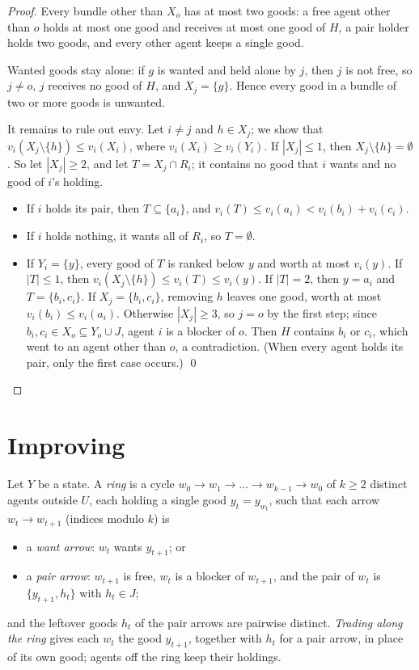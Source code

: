 \documentclass[runningheads,11pt]{llncs}
\begin{document}
\begin{proof}
Every bundle other than $X_o$ has at most two goods: a free agent other than $o$ holds at most one good and receives at most one good of $H$, a pair holder holds two goods, and every other agent keeps a single good.

Wanted goods stay alone: if $g$ is wanted and held alone by $j$, then $j$ is not free, so $j\ne o$, $j$ receives no good of $H$, and $X_j=\{g\}$. Hence every good in a bundle of two or more goods is unwanted.

It remains to rule out envy. Let $i\ne j$ and $h\in X_j$; we show that $v_i(X_j\setminus\{h\})\le v_i(X_i)$, where $v_i(X_i)\ge v_i(Y_i)$. If $|X_j|\le1$, then $X_j\setminus\{h\}=\emptyset$. So let $|X_j|\ge2$, and let $T=X_j\cap R_i$; it contains no good that $i$ wants and no good of $i$'s holding.
\begin{itemize}
\item If $i$ holds its pair, then $T\subseteq\{a_i\}$, and $v_i(T)\le v_i(a_i)<v_i(b_i)+v_i(c_i)$.
\item If $i$ holds nothing, it wants all of $R_i$, so $T=\emptyset$.
\item If $Y_i=\{y\}$, every good of $T$ is ranked below $y$ and worth at most $v_i(y)$. If $|T|\le1$, then $v_i(X_j\setminus\{h\})\le v_i(T)\le v_i(y)$. If $|T|=2$, then $y=a_i$ and $T=\{b_i,c_i\}$. If $X_j=\{b_i,c_i\}$, removing $h$ leaves one good, worth at most $v_i(b_i)\le v_i(a_i)$. Otherwise $|X_j|\ge3$, so $j=o$ by the first step; since $b_i,c_i\in X_o\subseteq Y_o\cup J$, agent $i$ is a blocker of $o$. Then $H$ contains $b_i$ or $c_i$, which went to an agent other than $o$, a contradiction. (When every agent holds its pair, only the first case occurs.) \qed
\end{itemize}
\end{proof}

\section{Improving}\label{sec:improve}

\begin{definition}[rings]\label{def:ring}
Let $Y$ be a state. A \emph{ring} is a cycle $w_0\to w_1\to\dots\to w_{k-1}\to w_0$ of $k\ge2$ distinct agents outside $U$, each holding a single good $y_t=y_{w_t}$, such that each arrow $w_t\to w_{t+1}$ (indices modulo $k$) is
\begin{itemize}
\item a \emph{want arrow}: $w_t$ wants $y_{t+1}$; or
\item a \emph{pair arrow}: $w_{t+1}$ is free, $w_t$ is a blocker of $w_{t+1}$, and the pair of $w_t$ is $\{y_{t+1},h_t\}$ with $h_t\in J$;
\end{itemize}
and the leftover goods $h_t$ of the pair arrows are pairwise distinct. \emph{Trading along the ring} gives each $w_t$ the good $y_{t+1}$, together with $h_t$ for a pair arrow, in place of its own good; agents off the ring keep their holdings.
\end{definition}
\end{document}
